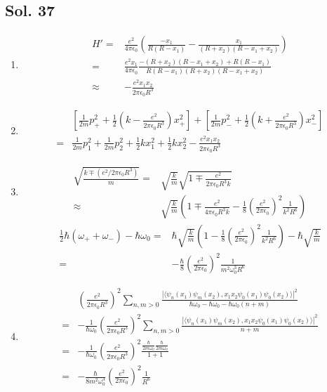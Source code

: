 \subsection*{Sol. 37}
\begin{enumerate}
    \item 
    \begin{align*}
        H'=&\frac{e^2}{4\pi\epsilon_0}
        \left(\frac{-x_1}{R(R-x_1)}
        -
        \frac{x_1}{(R+x_2)(R-x_1+x_2)}
        \right)\\
        =&
        \frac{e^2x_1}{4\pi\epsilon_0 }
        \frac{-(R+x_2)(R-x_1+x_2)+R(R-x_1)}{R(R-x_1)(R+x_2)(R-x_1+x_2)}\\
        \approx &
        -\frac{e^2x_1x_2}{2\pi\epsilon_0 R^3}
    \end{align*}
    \item 
    \begin{align*}
        &\left[\frac{1}{2m}p_+^2 + \frac{1}{2}\left(
        k - \frac{e^2}{2\pi\epsilon_0 R^3}\right)x_+^2
        \right]
        +
        \left[\frac{1}{2m}p_-^2 + \frac{1}{2}\left(
        k + \frac{e^2}{2\pi\epsilon_0 R^3}\right)x_-^2
        \right]\\
        =&\frac{1}{2m}p_1^2 + \frac{1}{2m}p_2^2
        +\frac{1}{2}kx_1^2 + \frac{1}{2}kx_2^2 - \frac{e^2x_1x_2}{2\pi\epsilon_0R^3}
    \end{align*}
    \item 
    \begin{align*}
        \sqrt{\frac{k\mp (e^2/2\pi\epsilon_0R^3)}{m}} = &\sqrt{\frac{k}{m}}\sqrt{1\mp \frac{e^2}{2\pi\epsilon_0R^3k}}\\
        \approx& 
        \sqrt{\frac{k}{m}}\left(1\mp\frac{e^2}{4\pi\epsilon_0R^3k}
        -\frac{1}{8}\left(\frac{e^2}{2\pi\epsilon_0}\right)^2\frac{1}{k^2R^6}
        \right)
    \end{align*}
    \begin{align*}
        \frac{1}{2}\hbar(\omega_+ + \omega_-) - \hbar \omega_0 = &
        \hbar\sqrt{\frac{k}{m}}\left(
        1-\frac{1}{8}\left(\frac{e^2}{2\pi\epsilon_0}\right)^2\frac{1}{k^2R^6}
        \right)-\hbar \sqrt{\frac{k}{m}}\\
        =&-\frac{\hbar}{8}\left(\frac{e^2}{2\pi\epsilon_0}\right)^2\frac{1}{m^2\omega_0^3R^6}
    \end{align*}
    \item 
    
    \begin{align*}
     &\left(\frac{e^2}{2\pi\epsilon_0R^3}\right)^2\sum_{n,m>0}\frac{|\langle\psi_n(x_1)\psi_m(x_2),x_1x_2\psi_0(x_1)\psi_0(x_2)\rangle|^2}{\hbar\omega_0-\hbar\omega_0 - \hbar\omega_0(n+m)}\\
     =&-\frac{1}{\hbar\omega_0}\left(\frac{e^2}{2\pi\epsilon_0R^3}\right)^2\sum_{n,m>0}\frac{|\langle\psi_n(x_1)\psi_m(x_2),x_1x_2\psi_0(x_1)\psi_0(x_2)\rangle|^2}{n+m}\\
     =&
     -\frac{1}{\hbar\omega_0}\left(\frac{e^2}{2\pi\epsilon_0R^3}\right)^2
     \frac{\frac{\hbar}{2m\omega_0}\frac{\hbar}{2m\omega_0}}{1+1}\\
     =&-\frac{\hbar}{8m^2\omega_0^3}\left(\frac{e^2}{2\pi\epsilon_0}\right)^2\frac{1}{R^6}
    \end{align*}
    

\end{enumerate}
